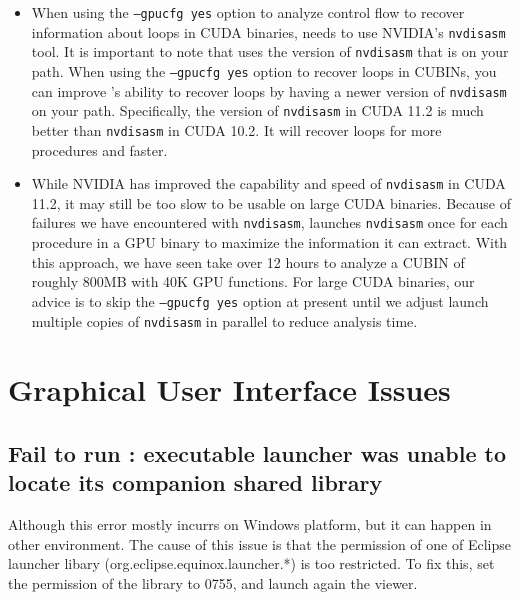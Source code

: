 \documentclass[11pt,twoside,letterpaper]{report}
\begin{document}
\begin{itemize}
\item
 When using the {\tt --gpucfg yes} option to analyze control flow to recover information about loops in CUDA binaries, \hpcstruct{} needs to use NVIDIA's {\tt nvdisasm} tool. It is important to note that \hpcstruct{} uses the version of {\tt nvdisasm} that is on your path. When using the {\tt --gpucfg yes} option to recover loops in CUBINs, you  can improve  \hpcstruct{}'s ability to recover loops by having a newer version of {\tt nvdisasm} on your path. Specifically, the version of {\tt nvdisasm} in CUDA 11.2  is much better than  {\tt nvdisasm} in CUDA 10.2. It will recover loops for more procedures and faster.
\item While NVIDIA has improved the capability and speed of {\tt nvdisasm} in CUDA 11.2, it may still be too slow to be usable on large CUDA binaries.  Because of failures we have encountered with {\tt nvdisasm},  \hpcstruct{} launches {\tt nvdisasm} once for each procedure in a GPU binary to maximize the information it can extract. With this approach, we have  seen  \hpcstruct{}   take over 12 hours to analyze a CUBIN of roughly 800MB with 40K GPU functions. For large CUDA binaries, our advice is to skip the {\tt --gpucfg yes} option at present until we adjust  \hpcstruct{} launch multiple copies of {\tt nvdisasm} in parallel to reduce analysis time.
\end{itemize}


\section{Graphical User Interface Issues}


\subsection{Fail to run \hpcviewer{}: executable launcher was unable to locate its companion shared library}

Although this error mostly incurrs on Windows platform, but it can happen in other environment.
The cause of this issue is that the permission of one of Eclipse launcher libary (org.eclipse.equinox.launcher.*) is too restricted.
To fix this, set the permission of the library to 0755, and launch again the viewer.
\end{document}
